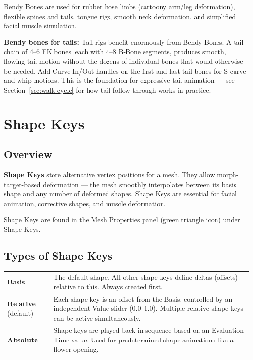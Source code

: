 Bendy Bones are used for rubber hose limbs (cartoony arm/leg deformation), flexible spines and tails, tongue rigs, smooth neck deformation, and simplified facial muscle simulation.

\begin{furrybox}
\textbf{Bendy bones for tails:} Tail rigs benefit enormously from Bendy Bones. A tail chain of 4--6 FK bones, each with 4--8 B-Bone segments, produces smooth, flowing tail motion without the dozens of individual bones that would otherwise be needed. Add Curve In/Out handles on the first and last tail bones for S-curve and whip motions. This is the foundation for expressive tail animation --- see Section~\ref{sec:walk-cycle} for how tail follow-through works in practice.
\end{furrybox}


\section{Shape Keys}
\label{sec:shape-keys}

\subsection{Overview}

\textbf{Shape Keys} store alternative vertex positions for a mesh. They allow morph-target-based deformation --- the mesh smoothly interpolates between its basis shape and any number of deformed shapes. Shape Keys are essential for facial animation, corrective shapes, and muscle deformation.

Shape Keys are found in the Mesh Properties panel (green triangle icon) under Shape Keys.

\subsection{Types of Shape Keys}

\begin{center}
\begin{tabularx}{\textwidth}{L{2.5cm}X}
\toprule
{}
 &  \\
\midrule
\textbf{Basis} & The default shape. All other shape keys define deltas (offsets) relative to this. Always created first. \\
\textbf{Relative} (default) & Each shape key is an offset from the Basis, controlled by an independent Value slider (0.0--1.0). Multiple relative shape keys can be active simultaneously. \\
\textbf{Absolute} & Shape keys are played back in sequence based on an Evaluation Time value. Used for predetermined shape animations like a flower opening. \\
\bottomrule
\end{tabularx}
\end{center}

